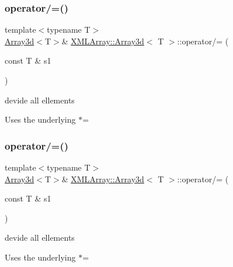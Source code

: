 \subsubsection{\texorpdfstring{operator/=()}{operator/=()}\hspace{0.1cm}{\footnotesize\ttfamily [5/6]}}
{\footnotesize\ttfamily template$<$typename T$>$ \\
\mbox{\hyperlink{classXMLArray_1_1Array3d}{Array3d}}$<$T$>$\& \mbox{\hyperlink{classXMLArray_1_1Array3d}{X\+M\+L\+Array\+::\+Array3d}}$<$ T $>$\+::operator/= (\begin{DoxyParamCaption}\item[{const T \&}]{s1 }\end{DoxyParamCaption})\hspace{0.3cm}{\ttfamily [inline]}}



devide all ellements 

Uses the underlying $\ast$= \mbox{\label{classXMLArray_1_1Array3d_a28d7fb90e93469c69a1e0bd563967792}} 
\subsubsection{\texorpdfstring{operator/=()}{operator/=()}\hspace{0.1cm}{\footnotesize\ttfamily [6/6]}}
{\footnotesize\ttfamily template$<$typename T$>$ \\
\mbox{\hyperlink{classXMLArray_1_1Array3d}{Array3d}}$<$T$>$\& \mbox{\hyperlink{classXMLArray_1_1Array3d}{X\+M\+L\+Array\+::\+Array3d}}$<$ T $>$\+::operator/= (\begin{DoxyParamCaption}\item[{const T \&}]{s1 }\end{DoxyParamCaption})\hspace{0.3cm}{\ttfamily [inline]}}



devide all ellements 

Uses the underlying $\ast$= \mbox{\label{classXMLArray_1_1Array3d_a797bc6cb731b7e9a8fbe0bf72d87678e}} 
